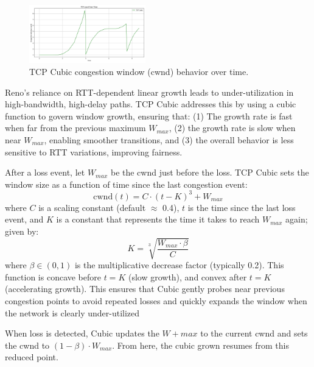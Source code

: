 \documentclass[conference]{IEEEtran}
\begin{document}
\begin{figure}[!t]
    \centering
    \includegraphics[width=0.45\textwidth]{assets/cubpic_swnd_vs_t.png}
    \caption{TCP Cubic congestion window (cwnd) behavior over time.}
    \label{fig:cubic_cwnd}
\end{figure}

Reno's reliance on RTT-dependent linear growth leads to under-utilization in high-bandwidth, high-delay paths. TCP Cubic addresses this by using a cubic function to govern window growth, ensuring that:
(1) The growth rate is fast when far from the previous maximum $W_{max}$,
(2) the growth rate is slow when near $W_{max}$, enabling smoother transitions, and
(3) the overall behavior is less sensitive to RTT variations, improving fairness.

After a loss event, let $W_{max}$ be the cwnd just before the loss. 
TCP Cubic sets the window size as a function of time since the last congestion event:
\begin{equation}
    \text{cwnd}(t) = C \cdot (t - K)^3 + W_{max} \label{eq:3}
\end{equation}
where $C$ is a scaling constant (default $\approx$ 0.4), $t$ is the time since the last loss event, and $K$ is a constant that represents the time it takes to reach $W_{max}$ again; given by:
\begin{equation}
    K = \sqrt[3]{\frac{W_{max}\cdot \beta}{C}} \label{eq:4}
\end{equation} 
where $\beta \in (0,1)$ is the multiplicative decrease factor (typically 0.2).
This function is concave before $t=K$ (slow growth), and convex after $t=K$ (accelerating growth). 
This ensures that Cubic gently probes near previous congestion points to avoid repeated losses and quickly expands the window when the network is clearly under-utilized

When loss is detected, Cubic updates the $W+{max}$ to the current cwnd and sets the cwnd to $(1-\beta)\cdot W_{max}$.
From here, the cubic grown resumes from this reduced point.
\end{document}
